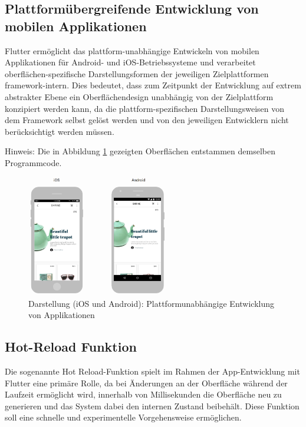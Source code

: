 \documentclass[bibliography=totoc,listof=totoc,BCOR=5mm,DIV=12,oneside]{scrbook}
\begin{document}
\subsection{Plattformübergreifende Entwicklung von mobilen Applikationen}
\par Flutter ermöglicht das plattform-unabhängige Entwickeln von mobilen Applikationen für Android- und iOS-Betriebssysteme und verarbeitet oberflächen-spezifische Darstellungsformen der jeweiligen Zielplattformen framework-intern. Dies bedeutet, dass zum Zeitpunkt der Entwicklung auf extrem abstrakter Ebene ein Oberflächendesign unabhängig von der Zielplattform konzipiert werden kann, da die plattform-spezifischen Darstellungsweisen von dem Framework selbst gelöst werden und von den jeweiligen Entwicklern nicht berücksichtigt werden müssen. 
\par \bigskip Hinweis: Die in Abbildung \ref{img:FlutterVisualisierungiOSAndoid} gezeigten Oberflächen entstammen demselben Programmcode.

\begin{figure}[H]
	\centering
	\includegraphics[width=0.55\textwidth, keepaspectratio]{Bilder/PlattformUebergreifendDesign.png}
	\caption{Darstellung (iOS und Android): Plattformunabhängige Entwicklung von Applikationen \cite[What is Flutter?]{Flu8}}
	\label{img:FlutterVisualisierungiOSAndoid}
\end{figure}

\newpage
\subsection{Hot-Reload Funktion}
\par Die sogenannte \grqq Hot Reload\grqq -Funktion spielt im Rahmen der App-Entwicklung mit Flutter eine primäre Rolle, da bei Änderungen an der Oberfläche während der Laufzeit ermöglicht wird, innerhalb von \grqq Millisekunden\grqq{} die Oberfläche neu zu generieren und das System dabei den internen Zustand beibehält. Diese Funktion soll eine schnelle und experimentelle Vorgehensweise ermöglichen.\citep{Flu1}
\end{document}
